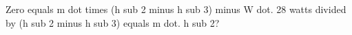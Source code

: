Zero equals m dot times (h sub 2 minus h sub 3) minus W dot.  
28 watts divided by (h sub 2 minus h sub 3) equals m dot.  
h sub 2?